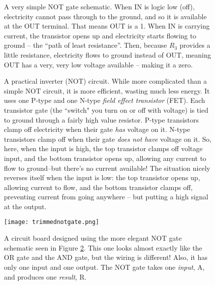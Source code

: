\begin{figure}[!h]
\begin{center}

\caption{A very simple NOT gate schematic. When IN is logic low (off), electricity cannot pass through to the ground, and so it is available at the OUT terminal. That means OUT is a 1. When IN is carrying current, the transistor opens up and electricity starts flowing to ground -- the ``path of least resistance''. Then, because $R_3$ provides a little resistance, electricity flows to ground instead of OUT, meaning OUT has a very, very low voltage available -- making it a zero.}
\label{fig:simplenot}
\end{center}
\end{figure}


\begin{figure}[!ht]
\begin{center}


\caption{A practical inverter (NOT) circuit. While more complicated than a simple NOT circuit, it is more efficient, wasting much less energy. It uses one P-type and one N-type \emph{field effect transistor} (FET). Each transistor gate (the ``switch" you turn on or off with voltage) is tied to ground through a fairly high value resistor. P-type transistors clamp off electricity when their gate \emph{has} voltage on it. N-type transistors clamp off when their gate \emph{does not have} voltage on it. So, here, when the input is high, the top transistor clamps off voltage input, and the bottom transistor opens up, allowing any current to flow to ground--but there's no current available! The situation nicely reverses itself when the input is low: the top transistor opens up, allowing current to flow, and the bottom transistor clamps off, preventing current from going anywhere -- but putting a high signal at the output.  }
\label{fig:cmosnot}
\end{center}
\end{figure}


\begin{figure}[!ht]
\begin{center}
\texttt{[image: trimmednotgate.png]} %
\caption{A circuit board designed using the more elegant NOT gate schematic seen in Figure \ref{fig:cmosnot}. This one looks almost exactly like the OR gate and the AND gate, but the wiring is different! Also, it has only one input and one output. The NOT gate takes one \emph{input}, A, and produces one \emph{result}, R.}
\label{fig:notgateboard}
\end{center}
\end{figure}

